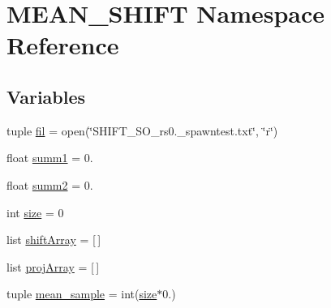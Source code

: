\hypertarget{namespaceMEAN__SHIFT}{\section{M\-E\-A\-N\-\_\-\-S\-H\-I\-F\-T Namespace Reference}
\label{namespaceMEAN__SHIFT}
}
\subsection*{Variables}
\begin{DoxyCompactItemize}
\item 
tuple \hyperlink{namespaceMEAN__SHIFT_a8d3baad9fa0bb397ed36b32af03a996c}{fil} = open(\char`\"{}S\-H\-I\-F\-T\-\_\-S\-O\-\_\-rs0.\-\_\-spawntest.\-txt\char`\"{}, \char`\"{}r\char`\"{})
\item 
float \hyperlink{namespaceMEAN__SHIFT_ab363dbe83b6b64b4094afc53344d26e5}{summ1} = 0.
\item 
float \hyperlink{namespaceMEAN__SHIFT_a7b21170da1a790f9557c94ababdcec64}{summ2} = 0.
\item 
int \hyperlink{namespaceMEAN__SHIFT_af4d778da1742ea5b786bd8206225d49c}{size} = 0
\item 
list \hyperlink{namespaceMEAN__SHIFT_acb855d2b8fde0351f8cc49e8f804fdce}{shift\-Array} = \mbox{[}$\,$\mbox{]}
\item 
list \hyperlink{namespaceMEAN__SHIFT_acb79b39dec43809410d06cd50001c6cc}{proj\-Array} = \mbox{[}$\,$\mbox{]}
\item 
tuple \hyperlink{namespaceMEAN__SHIFT_a082081f2418662ad1850a0ac0178eb19}{mean\-\_\-sample} = int(\hyperlink{namespaceMEAN__SHIFT_af4d778da1742ea5b786bd8206225d49c}{size}$\ast$0.)
\end{DoxyCompactItemize}



